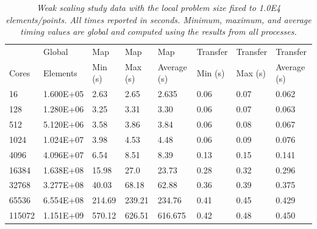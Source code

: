\documentclass{mc2013}
\begin{document}
\begin{table}[htpb!]
  \begin{center}
    \begin{tabular}{llllllll}\hline\hline
      \multicolumn{1}{l}{} & 
      \multicolumn{1}{l}{Global} & 
      \multicolumn{1}{l}{Map} & 
      \multicolumn{1}{l}{Map} & 
      \multicolumn{1}{l}{Map} & 
      \multicolumn{1}{l}{Transfer} & 
      \multicolumn{1}{l}{Transfer} & 
      \multicolumn{1}{l}{Transfer}\\
      \multicolumn{1}{l}{Cores} & 
      \multicolumn{1}{l}{Elements} & 
      \multicolumn{1}{l}{Min (s)} & 
      \multicolumn{1}{l}{Max (s)} & 
      \multicolumn{1}{l}{Average (s)} & 
      \multicolumn{1}{l}{Min (s)} & 
      \multicolumn{1}{l}{Max (s)} & 
      \multicolumn{1}{l}{Average (s)}\\ \hline\hline
16 &	1.600E+05 & 2.63 &	2.65 &	  2.635 &	0.06 & 0.07 &	0.062 \\
128 &	1.280E+06 & 3.25 &	3.31 &	  3.30 &	0.06 &	0.07 &	0.063 \\
512 &	5.120E+06 & 3.58 &	3.86 &	  3.84 &	0.06 &	0.08 &	0.067 \\
1024 &	1.024E+07 & 3.98 &	4.53 &    4.48 &	0.06 &	0.09 &	0.076 \\
4096 &	4.096E+07 & 6.54 &	8.51 &	  8.39 &	0.13 &	0.15 &	0.141 \\
16384 &	1.638E+08 & 15.98 &	27.0 &	  23.73 &	0.28 &	0.32 &	0.296 \\
32768 &	3.277E+08 & 40.03 &	68.18 &   62.88 &	0.36 &	0.39 &	0.375 \\
65536 &	6.554E+08 & 214.69 & 239.21	& 234.76 &	0.41 &	0.45 & 0.429 \\
115072 & 1.151E+09 & 570.12 & 626.51	& 616.675 &	0.42 &	0.48 &	0.450 \\
      \hline\hline
    \end{tabular}
  \end{center}
  \caption{\sl Weak scaling study data with the local problem size
    fixed to 1.0E4 elements/points. All times reported in
    seconds. Minimum, maximum, and average timing values are global
    and computed using the results from all processes.}
  \label{tab:weak_scaling}
\end{table}
\end{document}
